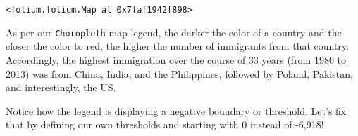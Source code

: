 \documentclass[11pt]{article}
\makeatletter
\newcommand{\boxspacing}{\kern\kvtcb@left@rule\kern\kvtcb@boxsep}
\newcommand{\prompt}[4]{
        \ttfamily\llap{{\color{#2}[#3]:\hspace{3pt}#4}}\vspace{-\baselineskip}
    }
\makeatother
\begin{document}
            \begin{tcolorbox}[breakable, size=fbox, boxrule=.5pt, pad at break*=1mm, opacityfill=0]
\prompt{Out}{outcolor}{32}{\boxspacing}
\begin{Verbatim}[commandchars=\\\{\}]
<folium.folium.Map at 0x7faf1942f898>
\end{Verbatim}
\end{tcolorbox}
        
    As per our \texttt{Choropleth} map legend, the darker the color of a
country and the closer the color to red, the higher the number of
immigrants from that country. Accordingly, the highest immigration over
the course of 33 years (from 1980 to 2013) was from China, India, and
the Philippines, followed by Poland, Pakistan, and interestingly, the
US.

    Notice how the legend is displaying a negative boundary or threshold.
Let's fix that by defining our own thresholds and starting with 0
instead of -6,918!
\end{document}
